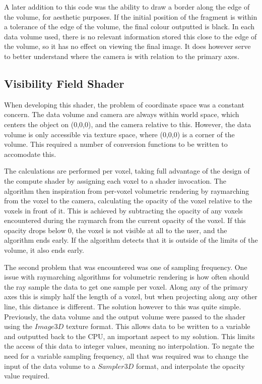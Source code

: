 A later addition to this code was the ability to draw a border along the edge of the volume, for aesthetic purposes. If the initial position of the fragment is within a tolerance of the edge of the volume, the final colour outputted is black. In each data volume used, there is no relevant information stored this close to the edge of the volume, so it has no effect on viewing the final image. It does however serve to better understand where the camera is with relation to the primary axes.

\subsection{Visibility Field Shader}

When developing this shader, the problem of coordinate space was a constant concern. The data volume and camera are always within world space, which centers the object on (0,0,0), and the camera relative to this. However, the data volume is only accessible via texture space, where (0,0,0) is a corner of the volume. This required a number of conversion functions to be written to accomodate this.

The calculations are performed per voxel, taking full advantage of the design of the compute shader by assigning each voxel to a shader invocation. The algorithm then inspiration from per-voxel volumetric rendering by raymarching from the voxel to the camera, calculating the opacity of the voxel relative to the voxels in front of it. This is achieved by subtracting the opacity of any voxels encountered during the raymarch from the current opacity of the voxel. If this opacity drops below 0, the voxel is not visible at all to the user, and the algorithm ends early. If the algorithm detects that it is outside of the limits of the volume, it also ends early.

The second problem that was encountered was one of sampling frequency. One issue with raymarching algorithms for volumetric rendering is how often should the ray sample the data to get one sample per voxel. Along any of the primary axes this is simply half the length of a voxel, but when projecting along any other line, this distance is different. The solution however to this was quite simple. Previously, the data volume and the output volume were passed to the shader using the $Image3D$ texture format. This allows data to be written to a variable and outputted back to the CPU, an important aspect to my solution. This limits the access of this data to integer values, meaning no interpolation. To negate the need for a variable sampling frequency, all that was required was to change the input of the data volume to a $Sampler3D$ format, and interpolate the opacity value required.

